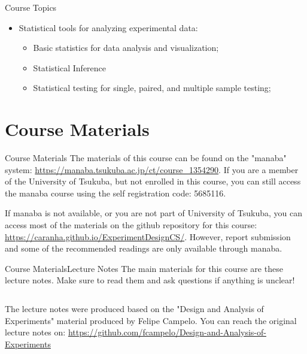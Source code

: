 \documentclass{beamer}
\begin{document}
\begin{CJK}{UTF8}{ipxm}
\begin{frame}{Course Topics}
\begin{itemize}
    \item Statistical tools for analyzing experimental data:
    \begin{itemize}
      \item Basic statistics for data analysis and visualization;
      \item Statistical Inference
      \item Statistical testing for single, paired, and multiple sample testing;
    \end{itemize}
  \end{itemize}
\end{frame}


\section{Course Materials}
\begin{frame}{Course Materials}
  The materials of this course can be found on the "manaba" system: \url{https://manaba.tsukuba.ac.jp/ct/course_1354290}. If you are a member of the University of Tsukuba, but not enrolled in this course, you can still access the manaba course using the self registration code: 5685116.
  \bigskip

  If manaba is not available, or you are not part of University of Tsukuba, you can access most of the materials on the github repository for this course: \url{https://caranha.github.io/ExperimentDesignCS/}. However, report submission and some of the recommended readings are only available through manaba.
\end{frame}

\begin{frame}{Course Materials}{Lecture Notes}
  The main materials for this course are these lecture notes.
  Make sure to read them and ask questions if anything is unclear!
  \vspace{1cm}

  \begin{columns}
    The lecture notes were produced based on the "Design and Analysis of Experiments" material produced by Felipe Campelo. You can reach the original lecture notes on: \url{https://github.com/fcampelo/Design-and-Analysis-of-Experiments}


\end{columns}
\end{frame}
\end{CJK}
\end{document}
